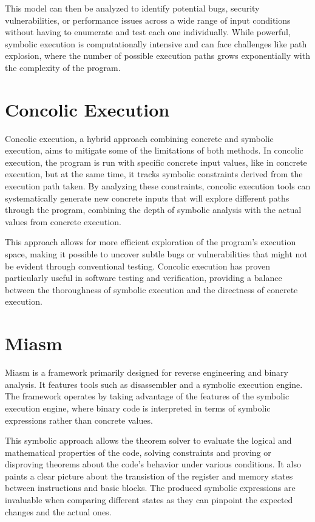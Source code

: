 This model can then be analyzed to identify potential bugs, security vulnerabilities, or performance issues across a wide range of input conditions without having to enumerate and test each one individually. 
While powerful, symbolic execution is computationally intensive and can face challenges like path explosion, where the number of possible execution paths grows exponentially with the complexity of the program.



\section{Concolic Execution} 
Concolic execution, a hybrid approach combining concrete and symbolic execution, aims to mitigate some of the limitations of both methods. 
In concolic execution, the program is run with specific concrete input values, like in concrete execution, but at the same time, it tracks symbolic constraints derived from the execution path taken. 
By analyzing these constraints, concolic execution tools can systematically generate new concrete inputs that will explore different paths through the program, combining the depth of symbolic analysis with the actual values from concrete execution.

This approach allows for more efficient exploration of the program's execution space, making it possible to uncover subtle bugs or vulnerabilities that might not be evident through conventional testing. 
Concolic execution has proven particularly useful in software testing and verification, providing a balance between the thoroughness of symbolic execution and the directness of concrete execution.

\section{Miasm}
Miasm \cite{desclaux2012miasm} is a framework primarily designed for reverse engineering and binary analysis.
It features tools such as disassembler and a symbolic execution engine.
The framework operates by taking advantage of the features of the symbolic execution engine, where binary code is interpreted in terms of symbolic expressions rather than concrete values.

This symbolic approach allows the theorem solver to evaluate the logical and mathematical properties of the code, solving constraints and proving or disproving theorems about the code's behavior under various conditions.
It also paints a clear picture about the transistion of the register and memory states between instructions and basic blocks.
The produced symbolic expressions are invaluable when comparing different states as they can pinpoint the expected changes and the actual ones.

